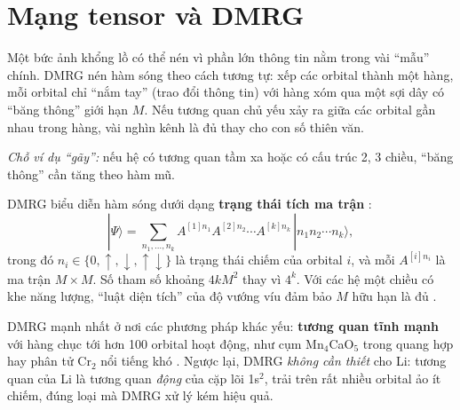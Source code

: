 \section{Mạng tensor và DMRG}

\begin{eli5}
Một bức ảnh khổng lồ có thể nén vì phần lớn thông tin nằm trong vài ``mẫu'' chính. DMRG nén hàm sóng theo cách tương tự: xếp các orbital thành một hàng, mỗi orbital chỉ ``nắm tay'' (trao đổi thông tin) với hàng xóm qua một sợi dây có ``băng thông'' giới hạn $M$. Nếu tương quan chủ yếu xảy ra giữa các orbital gần nhau trong hàng, vài nghìn kênh là đủ thay cho con số thiên văn.

\emph{Chỗ ví dụ ``gãy'':} nếu hệ có tương quan tầm xa hoặc có cấu trúc 2, 3 chiều, ``băng thông'' cần tăng theo hàm mũ.
\end{eli5}

\begin{congthuc}
DMRG \cite{White1992} biểu diễn hàm sóng dưới dạng \textbf{trạng thái tích ma trận} :
\[
|\Psi\rangle=\sum_{n_1,\ldots,n_k}A^{[1]n_1}A^{[2]n_2}\cdots A^{[k]n_k}\,|n_1n_2\cdots n_k\rangle ,
\]
trong đó $n_i\in\{0,\uparrow,\downarrow,\uparrow\!\downarrow\}$ là trạng thái chiếm của orbital $i$, và mỗi $A^{[i]n_i}$ là ma trận $M\times M$. Số tham số khoảng $4kM^2$ thay vì $4^k$. Với các hệ một chiều có khe năng lượng, ``luật diện tích'' của độ vướng víu đảm bảo $M$ hữu hạn là đủ \cite{ChanSharma2011}.
\end{congthuc}

DMRG mạnh nhất ở nơi các phương pháp khác yếu: \textbf{tương quan tĩnh mạnh} với hàng chục tới hơn 100 orbital hoạt động, như cụm Mn$_4$CaO$_5$ trong quang hợp \cite{Kurashige2013} hay phân tử Cr$_2$ nổi tiếng khó \cite{Larsson2022}. Ngược lại, DMRG \emph{không cần thiết} cho Li: tương quan của Li là tương quan \emph{động} của cặp lõi 1s$^2$, trải trên rất nhiều orbital ảo ít chiếm, đúng loại mà DMRG xử lý kém hiệu quả.


